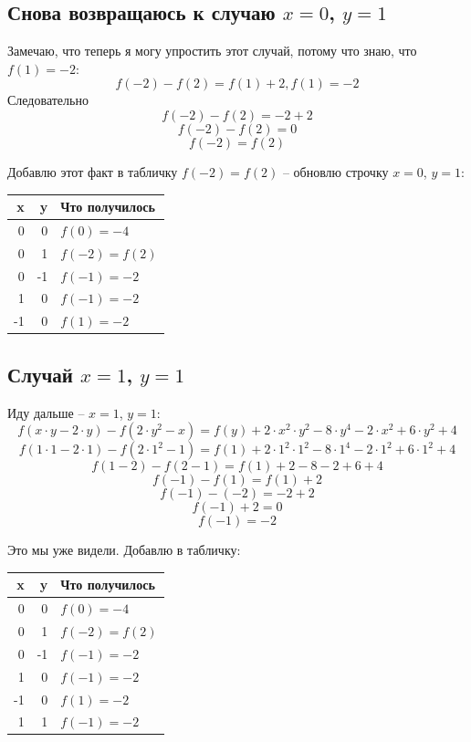 \documentclass{article}
\begin{document}
\subsection{Снова возвращаюсь к случаю $x=0$, $y=1$}
Замечаю, что теперь я могу упростить этот случай, потому что знаю, что $f(1)=-2$:
$$f(-2)-f(2)=f(1)+2, f(1)=-2$$
Следовательно
$$f(-2)-f(2)=-2+2$$
$$f(-2)-f(2)=0$$
$$f(-2)=f(2)$$

\begin{samepage}
Добавлю этот факт в табличку {\boldmath\color{red}$f(-2)=f(2)$} -- обновлю строчку $x=0$, $y=1$:
\begin{center}
 \begin{tabular}{r r l}
 \hline
 x & y & Что получилось        \\
 \hline
  0 &  0 & $f(0)=-4$           \\
  0 &  1 & $f(-2)=f(2)$        \\
  0 & -1 & $f(-1)=-2$          \\
  1 &  0 & $f(-1)=-2$          \\
 -1 &  0 & $f(1)=-2$ \\
 \hline
 \end{tabular}
\end{center}
\end{samepage}

\subsection{Случай $x=1$, $y=1$}
Иду дальше -- $x=1$, $y=1$:
$$f(x\cdot{}y-2\cdot{}y)-f(2\cdot{}y^2-x)=f(y)+2\cdot{}x^2\cdot{}y^2-8\cdot{}y^4-2\cdot{}x^2+6\cdot{}y^2+4$$
$$f(1\cdot{}1-2\cdot{}1)-f(2\cdot{}1^2-1)=f(1)+2\cdot{}1^2\cdot{}1^2-8\cdot{}1^4-2\cdot{}1^2+6\cdot{}1^2+4$$
$$f(1-2)-f(2-1)=f(1)+2-8-2+6+4$$
$$f(-1)-f(1)=f(1)+2$$
$$f(-1)-(-2)=-2+2$$
$$f(-1)+2=0$$
$$f(-1)=-2$$

\begin{samepage}
Это мы уже видели. Добавлю в табличку:
\begin{center}
 \begin{tabular}{r r l}
 \hline
 x & y & Что получилось        \\
 \hline
  0 &  0 & $f(0)=-4$           \\
  0 &  1 & $f(-2)=f(2)$        \\
  0 & -1 & $f(-1)=-2$          \\
  1 &  0 & $f(-1)=-2$          \\
 -1 &  0 & $f(1)=-2$           \\
  1 &  1 & $f(-1)=-2$ \\
  \hline
 \end{tabular}
\end{center}
\end{samepage}
\end{document}
